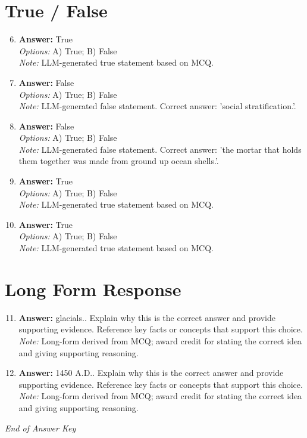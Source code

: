 \documentclass[12pt]{article}
\begin{document}
\section*{True / False}
\begin{enumerate}[label=\arabic*.]
\setcounter{enumi}{5}
\item \textbf{Answer:} True
\\ \textit{Options:} A) True; B) False
\\ \textit{Note:} LLM-generated true statement based on MCQ.
\item \textbf{Answer:} False
\\ \textit{Options:} A) True; B) False
\\ \textit{Note:} LLM-generated false statement. Correct answer: 'social stratification.'.
\item \textbf{Answer:} False
\\ \textit{Options:} A) True; B) False
\\ \textit{Note:} LLM-generated false statement. Correct answer: 'the mortar that holds them together was made from ground up ocean shells.'.
\item \textbf{Answer:} True
\\ \textit{Options:} A) True; B) False
\\ \textit{Note:} LLM-generated true statement based on MCQ.
\item \textbf{Answer:} True
\\ \textit{Options:} A) True; B) False
\\ \textit{Note:} LLM-generated true statement based on MCQ.
\end{enumerate}

\section*{Long Form Response}
\begin{enumerate}[label=\arabic*.]
\setcounter{enumi}{10}
\item \textbf{Answer:} glacials.. Explain why this is the correct answer and provide supporting evidence. Reference key facts or concepts that support this choice.
\\ \textit{Note:} Long-form derived from MCQ; award credit for stating the correct idea and giving supporting reasoning.
\item \textbf{Answer:} 1450 A.D.. Explain why this is the correct answer and provide supporting evidence. Reference key facts or concepts that support this choice.
\\ \textit{Note:} Long-form derived from MCQ; award credit for stating the correct idea and giving supporting reasoning.
\end{enumerate}

\vfill
\noindent\textit{End of Answer Key}
\end{document}
